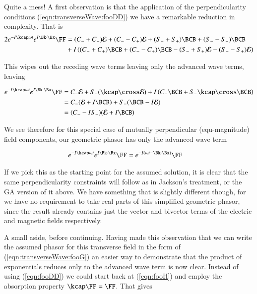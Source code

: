Quite a mess!  A first observation is that the application of the perpendicularity conditions (\ref{eqn:transverseWave:fooDD}) we have a remarkable reduction in complexity.  That is
\begin{align*}
2 e^{ -I \kcap \omega t } e^{ I \Bk \cdot \Bx } \FF
&=
 (C_{-} + C_{+}) \EE 
+(C_{-} - C_{+}) \EE
+(S_{-} + S_{+}) \BCB
+(S_{-} - S_{+}) \BCB
\\
&+{I}
\left( 
 (C_{-} + C_{+}) \BCB
+(C_{-} - C_{+}) \BCB
-(S_{-} + S_{+}) \EE
-(S_{-} - S_{+}) \EE 
\right) \\
\end{align*}

This wipes out the receding wave terms leaving only the advanced wave terms, leaving

\begin{align*}
e^{ -I \kcap \omega t } e^{ I \Bk \cdot \Bx } \FF
&=
 C_{-} \EE 
+S_{-} (\kcap \cross \EE)
+{I}
\left( 
 C_{-} \BCB +S_{-} \kcap \cross \BCB 
\right) \\
&=
 C_{-} (\EE + I\BCB)
+S_{-} (\BCB -I\EE) \\
&=
( C_{-} -I S_{-} ) (\EE + I\BCB) \\
\end{align*}

We see therefore for this special case of mutually perpendicular (equ-magnitude) field components, our geometric phasor has only the advanced wave term

\begin{align}\label{eqn:transverseWave:fooG}
e^{ -I \kcap \omega t } e^{ I \Bk \cdot \Bx } \FF &= e^{-I(\omega t - \Bk \cdot \Bx)} \FF
\end{align}

If we pick this as the starting point for the assumed solution, it is clear that the same perpendicularity constraints will follow as in Jackson's treatment, or the GA version of it above.  We have something that is slightly different though, for we have no requirement to take real parts of this simplified geometric phasor, since the result already contains just the vector and bivector terms of the electric and magnetic fields respectively.

A small aside, before continuing.  Having made this observation that we can write the assumed phasor for this transverse field in the form of (\ref{eqn:transverseWave:fooG}) an easier way to demonstrate that the product of exponentials reduces only to the advanced wave term is now clear.  Instead of using (\ref{eqn:fooDD}) we could start back at (\ref{eqn:fooH}) and employ the absorption property $\kcap \FF = \FF$.  That gives

